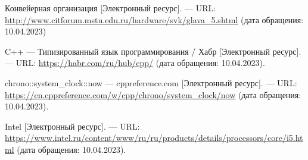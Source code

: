 
\renewcommand\bibname{Список использованных источников}
\begin{thebibliography}{}
 Конвейерная организация [Электронный ресурс]. --- URL: \url{http://www.citforum.mstu.edu.ru/hardware/svk/glava_5.shtml} (дата обращения: 10.04.2023)

C++ –– Типизированный язык программирования / Хабр [Электронный ресурс]. --- URL: \url{https://habr.com/ru/hub/cpp/} (дата обращения: 10.04.2023).

 chrono::system\_clock::now --- cppreference.com [Электронный ресурс]. --- URL: \url{https://en.cppreference.com/w/cpp/chrono/system_clock/now} (дата обращения: 10.04.2023).

 Intel [Электронный ресурс]. --- URL: \url{https://www.intel.ru/content/www/ru/ru/products/details/processors/core/i5.html} (дата обращения: 10.04.2023).

\end{thebibliography}